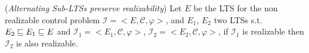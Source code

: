 \begin{lemma}\label{def:induction-preserves}(\emph{Alternating Sub-LTSs preserve realizability})
Let $E$ be the LTS for the non realizable control problem
$\mathcal{I}=<E,\mathcal{C}, \varphi>$, and $E_1$, $E_2$ two LTSs s.t. 
$E_2 \sqsubseteq E_1 \sqsubseteq E$ and
$\mathcal{I}_1=<E_1, \mathcal{C}, \varphi>$, $\mathcal{I}_2=<E_2, \mathcal{C}, \varphi>$, if $\mathcal{I}_1$ is realizable then $\mathcal{I}_2$ is also realizable.
\end{lemma}